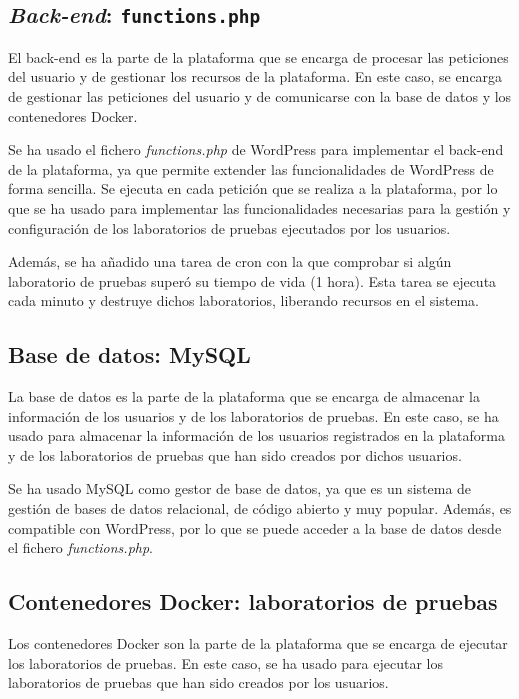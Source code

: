         \subsection{\textit{Back-end}: \texttt{functions.php}}
        
            El back-end es la parte de la plataforma que se encarga de procesar las peticiones del usuario y de gestionar los recursos de la plataforma. En este caso, se encarga de gestionar las peticiones del usuario y de comunicarse con la base de datos y los contenedores Docker.
            
            Se ha usado el fichero \textit{functions.php} de WordPress para implementar el back-end de la plataforma, ya que permite extender las funcionalidades de WordPress de forma sencilla. Se ejecuta en cada petición que se realiza a la plataforma, por lo que se ha usado para implementar las funcionalidades necesarias para la gestión y configuración de los laboratorios de pruebas ejecutados por los usuarios.

            Además, se ha añadido una tarea de cron con la que comprobar si algún laboratorio de pruebas superó su tiempo de vida (1 hora). Esta tarea se ejecuta cada minuto y destruye dichos laboratorios, liberando recursos en el sistema.


        \subsection{Base de datos: MySQL}

            La base de datos es la parte de la plataforma que se encarga de almacenar la información de los usuarios y de los laboratorios de pruebas. En este caso, se ha usado para almacenar la información de los usuarios registrados en la plataforma y de los laboratorios de pruebas que han sido creados por dichos usuarios.
            
            Se ha usado MySQL como gestor de base de datos, ya que es un sistema de gestión de bases de datos relacional, de código abierto y muy popular. Además, es compatible con WordPress, por lo que se puede acceder a la base de datos desde el fichero \textit{functions.php}.
        
        
        \subsection{Contenedores Docker: laboratorios de pruebas}

            Los contenedores Docker son la parte de la plataforma que se encarga de ejecutar los laboratorios de pruebas. En este caso, se ha usado para ejecutar los laboratorios de pruebas que han sido creados por los usuarios.
            
